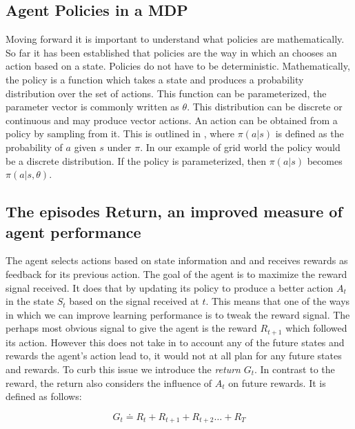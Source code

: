 \subsection{Agent Policies in a MDP}\label{subsec:policies}

Moving forward it is important to understand what policies are mathematically. So far it has been established that policies are the way in which an chooses an action based on a state. Policies do not have to be deterministic. Mathematically, the policy is a function which takes a state and produces a probability distribution over the set of actions. This function can be parameterized, the parameter vector is commonly written as $\theta$. This distribution can be discrete or continuous and may produce vector actions. An action can be obtained from a policy by sampling from it. This is outlined in , where $\pi(a|s)$ is defined as the probability of $a$ given $s$ under $\pi$. In our example of grid world the policy would be a discrete distribution. If the policy is parameterized, then $\pi(a|s)$ becomes $\pi(a|s,\theta)$. 

\subsection{The episodes Return, an improved measure of agent performance}\label{subsec:goals}

The agent selects actions based on state information and and receives rewards as feedback for its previous action. The goal of the agent is to maximize the reward signal received. It does that by updating its policy to produce a better action $A_t$ in the state $S_t$ based on the signal received at $t$. This means that one of the ways in which we can improve learning performance is to tweak the reward signal. The perhaps most obvious signal to give the agent is the reward $R_{t+1}$ which followed its action. However this does not take in to account any of the future states and rewards the agent's action lead to, it would not at all plan for any future states and rewards. To curb this issue we introduce the \textit{return} $G_t$. In contrast to the reward, the return also considers the influence of $A_t$ on future rewards. It is defined as follows:

\begin{equation}\label{MDP:return}
    G_t \doteq R_t + R_{t+1} + R_{t+2} \dots + R_T
\end{equation}
\centerline{\small{}}

